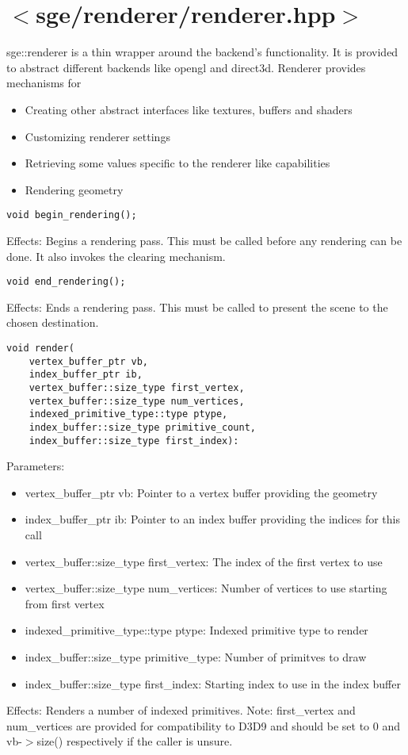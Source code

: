 \documentclass{article}
\begin{document}
\lstset{language=C++}

\section{$<$sge/renderer/renderer.hpp$>$}

sge::renderer is a thin wrapper around the backend's functionality.
It is provided to abstract different backends like opengl and direct3d.
Renderer provides mechanisms for
\begin{itemize}
\item{Creating other abstract interfaces like textures, buffers and shaders}
\item{Customizing renderer settings}
\item{Retrieving some values specific to the renderer like capabilities}
\item{Rendering geometry}
\end{itemize}

\begin{lstlisting}
void begin_rendering();
\end{lstlisting}
Effects: Begins a rendering pass.
This must be called before any rendering can be done.
It also invokes the clearing mechanism.

\begin{lstlisting}
void end_rendering();
\end{lstlisting}
Effects: Ends a rendering pass.
This must be called to present the scene to the chosen destination.

\begin{lstlisting}
void render(
	vertex_buffer_ptr vb,
 	index_buffer_ptr ib,
 	vertex_buffer::size_type first_vertex,
 	vertex_buffer::size_type num_vertices,
 	indexed_primitive_type::type ptype,
 	index_buffer::size_type primitive_count,
 	index_buffer::size_type first_index):
\end{lstlisting}
Parameters:
\begin{itemize}
\item vertex\_buffer\_ptr vb: Pointer to a vertex buffer providing the geometry
\item index\_buffer\_ptr ib: Pointer to an index buffer providing the indices for this call
\item vertex\_buffer::size\_type first\_vertex: The index of the first vertex to use
\item vertex\_buffer::size\_type num\_vertices: Number of vertices to use starting from first vertex
\item indexed\_primitive\_type::type ptype: Indexed primitive type to render
\item index\_buffer::size\_type primitive\_type: Number of primitves to draw
\item index\_buffer::size\_type first\_index: Starting index to use in the index buffer
\end{itemize}
Effects: Renders a number of indexed primitives.
Note: first\_vertex and num\_vertices are provided for compatibility to D3D9 and should be set to 0 and vb-$>$size() respectively if the caller is unsure.
\end{document}
